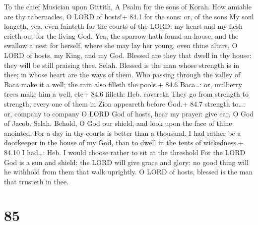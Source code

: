 To the chief Musician upon Gittith, A Psalm for the sons of Korah.
 How amiable are thy tabernacles, O LORD of hosts!+ 84.1 for
the sons: or, of the sons  My soul longeth, yea, even
fainteth for the courts of the LORD: my heart and my flesh crieth out
for the living God.  Yea, the sparrow hath found an house,
and the swallow a nest for herself, where she may lay her young, even
thine altars, O LORD of hosts, my King, and my God.  Blessed
are they that dwell in thy house: they will be still praising thee.
Selah.  Blessed is the man whose strength is in thee; in
whose heart are the ways of them.  Who passing through the
valley of Baca make it a well; the rain also filleth the pools.+ 84.6
Baca\ldots: or, mulberry trees make him a well, etc+ 84.6 filleth: Heb.
covereth  They go from strength to strength, every one of
them in Zion appeareth before God.+ 84.7 strength to\ldots: or, company
to company  O LORD God of hosts, hear my prayer: give ear, O
God of Jacob. Selah.  Behold, O God our shield, and look
upon the face of thine anointed.  For a day in thy courts
is better than a thousand. I had rather be a doorkeeper in the house of
my God, than to dwell in the tents of wickedness.+ 84.10 I had\ldots:
Heb. I would choose rather to sit at the threshold  For the
LORD God is a sun and shield: the LORD will give grace and glory: no
good thing will he withhold from them that walk uprightly. 
O LORD of hosts, blessed is the man that trusteth in thee.

\hypertarget{section-84}{%
\section{85}\label{section-84}}


